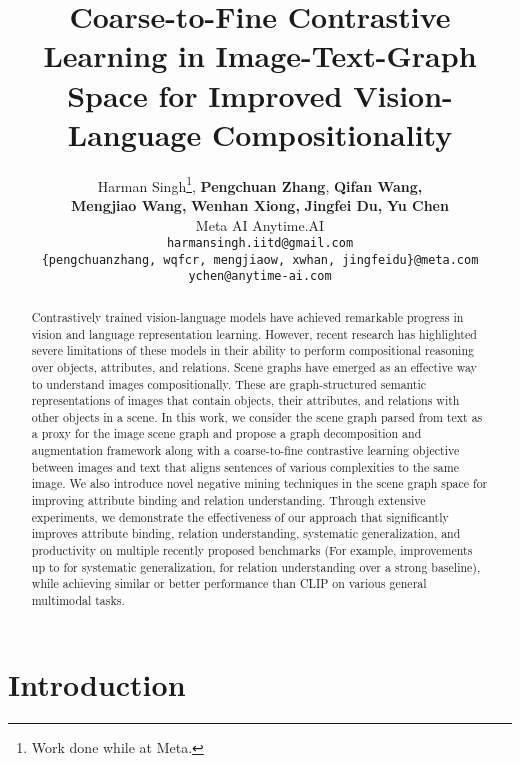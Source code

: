 \documentclass[11pt]{article}
\title{Coarse-to-Fine Contrastive Learning in Image-Text-Graph Space for Improved Vision-Language Compositionality}
\author{
    Harman Singh\thanks{\hspace{0.3em} Work done while at Meta.}\hspace{0.3em},  
    \textbf{Pengchuan Zhang},
    \textbf{Qifan Wang}\textbf{,} \\
    \textbf{Mengjiao Wang}\textbf{,}
    \textbf{Wenhan Xiong}\textbf{,}
    \textbf{Jingfei Du}\textbf{,}
    \textbf{Yu Chen}
    \\
    Meta AI \quad
    Anytime.AI\\
    \texttt{harmansingh.iitd@gmail.com} \\
    \texttt{\{pengchuanzhang, wqfcr, mengjiaow, xwhan, jingfeidu\}@meta.com} \\
    \texttt{ychen@anytime-ai.com}
}
\begin{document}
\maketitle

\newcommand{\Lcal}{\mathcal{L}}
\newcommand{\Bcal}{\mathcal{B}}
\newcommand{\Pcal}{\mathcal{P}}
\newcommand{\Ucal}{\mathcal{U}}
\newcommand{\Vcal}{\mathcal{V}}
\newcommand{\Ecal}{\mathcal{E}}
\newcommand{\Dcal}{\mathcal{D}}
\newcommand{\Ical}{\mathcal{I}}
\newcommand{\Tcal}{\mathcal{T}}
\newcommand{\Xcal}{\mathcal{X}}
\newcommand{\Gcal}{\mathcal{G}}
\newcommand{\uv}{\boldsymbol{u}}
\newcommand{\vv}{\boldsymbol{v}}
\newcommand{\xv}{\boldsymbol{x}}
\newcommand{\tv}{\boldsymbol{t}}
\newcommand{\gv}{\boldsymbol{g}}

\begin{abstract}
Contrastively trained vision-language models have achieved remarkable progress in vision and language representation learning. However, recent research has highlighted severe limitations of these models in their ability to perform compositional reasoning over objects, attributes, and relations. Scene graphs have emerged as an effective way to understand images compositionally. These are graph-structured semantic representations of images that contain objects, their attributes, and relations with other objects in a scene. In this work, we consider the scene graph parsed from text as a proxy for the image scene graph and propose a graph decomposition and augmentation framework along with a coarse-to-fine contrastive learning objective between images and text that aligns sentences of various complexities to the same image. We also introduce novel negative mining techniques in the scene graph space for improving attribute binding and relation understanding. Through extensive experiments, we demonstrate the effectiveness of our approach that significantly improves attribute binding, relation understanding, systematic generalization, and productivity on multiple recently proposed benchmarks (For example, improvements 
up to  for systematic generalization,  for relation understanding over a strong baseline), while achieving similar or better performance than CLIP on various general multimodal tasks.

\end{abstract} \section{Introduction}
\end{document}
